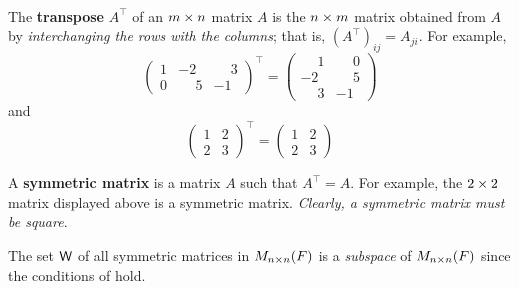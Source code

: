 \begin{additional definition} \label{adef 1.6}\ 

 The \textbf{transpose} \(A^\top\) of an \(m \times n\) matrix \(A\) is the \(n \times m\) matrix obtained from \(A\) by \emph{interchanging the rows with the columns};
that is, \((A^\top)_{ij} = A_{ji}\).
For example,
\[
\begin{pmatrix}
1 &           -2 & \phantom{-}3 \\
0 & \phantom{-}5 &           -1
\end{pmatrix}^\top =
\begin{pmatrix}
\phantom{-}1  & \phantom{-}0 \\
          -2  & \phantom{-}5 \\
\phantom{-}3  &           -1
\end{pmatrix}
\]
and
\[
\begin{pmatrix}
1 &  2 \\
2 &  3
\end{pmatrix}^\top =
\begin{pmatrix}
 1  &  2 \\
 2  &  3
\end{pmatrix}
\]

 A \textbf{symmetric matrix} is a matrix \(A\) such that \(A^\top = A\).
For example, the \(2 \times 2\) matrix displayed above is a symmetric matrix.
\emph{Clearly, a symmetric matrix must be square}.
\end{additional definition}

\begin{additional theorem} \label{athm 1.1}
The set \(\textsf{W}\) of all symmetric matrices in \(M_{n \times n}(F)\) is a \emph{subspace} of \(M_{n \times n}(F)\) since the conditions of  hold.
\end{additional theorem}

